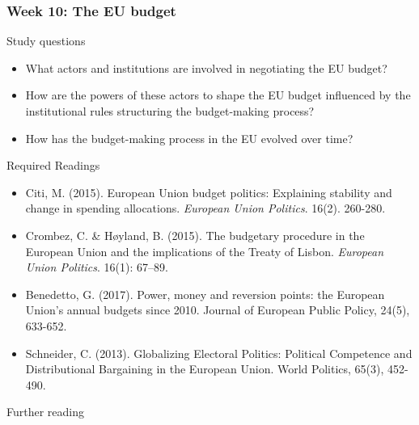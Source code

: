 \subsubsection*{Week 10: The EU budget}

Study questions

\begin{itemize}
	\item What actors and institutions are involved in negotiating the EU budget?
	\item How are the powers of these actors to shape the EU budget influenced by the institutional rules structuring the budget-making process?
	\item How has the budget-making process in the EU evolved over time? 
\end{itemize}

\noindent Required Readings

\begin{itemize}
	\item Citi, M. (2015). European Union budget politics: Explaining stability and change in spending allocations. \textit{European Union Politics}. 16(2). 260-280.
	\item Crombez, C. \& Høyland, B. (2015). The budgetary procedure in the European Union and the implications of the Treaty of Lisbon. \textit{European Union Politics}. 16(1): 67–89.
	\item Benedetto, G. (2017). Power, money and reversion points: the European Union's annual budgets since 2010. Journal of European Public Policy, 24(5), 633-652.
	\item Schneider, C. (2013). Globalizing Electoral Politics: Political Competence and Distributional Bargaining in the European Union. World Politics, 65(3), 452-490. 
\end{itemize}

\noindent Further reading

